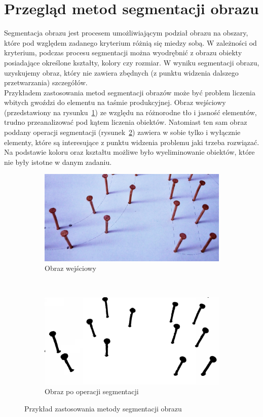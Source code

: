 \section{Przegląd metod segmentacji obrazu}
Segmentacja obrazu jest procesem umożliwiającym podział obrazu na obszary, które pod względem zadanego kryterium różnią się miedzy sobą. W zależności od kryterium, podczas procesu segmentacji można wyodrębnić z obrazu obiekty posiadające określone kształty, kolory czy rozmiar. W wyniku segmentacji obrazu, uzyskujemy obraz, który nie zawiera zbędnych (z punktu widzenia dalszego przetwarzania) szczegółów.\\
Przykładem zastosowania metod segmentacji obrazów może być problem liczenia wbitych gwoździ do elementu na taśmie produkcyjnej. Obraz wejściowy (przedstawiony na rysunku~\ref{fig:gwozdzie_input}) ze względu na różnorodne tło i jasność elementów, trudno przeanalizować pod kątem liczenia obiektów. Natomiast ten sam obraz poddany operacji segmentacji (rysunek~\ref{fig:gwozdzie_output}) zawiera w sobie tylko i wyłącznie elementy, które są interesujące z punktu widzenia problemu jaki trzeba rozwiązać. Na podstawie koloru oraz kształtu możliwe było wyeliminowanie obiektów, które nie były istotne w danym zadaniu.

\begin{figure}[H]
  \centering
  \begin{subfigure}[b]{0.48\textwidth}
    \includegraphics[width=\textwidth]{img/gwozdzie-input}
    \caption{Obraz wejściowy}
    \label{fig:gwozdzie_input}
  \end{subfigure}
  ~
  \begin{subfigure}[b]{0.48\textwidth}
    \includegraphics[width=\textwidth]{img/gwozdzie-output}
    \caption{Obraz po operacji segmentacji}
    \label{fig:gwozdzie_output}
  \end{subfigure}
  \caption{Przykład zastosowania metody segmentacji obrazu}\label{fig:gwozdzie}
\end{figure}

